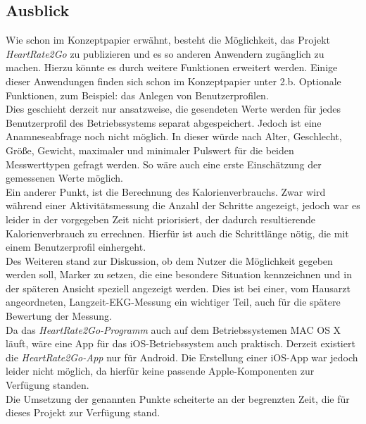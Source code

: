 \subsection{Ausblick} \label{sec:Ausblick}
Wie schon im Konzeptpapier erwähnt, besteht die Möglichkeit, das Projekt \textit{HeartRate2Go} zu publizieren und es so anderen Anwendern zugänglich zu machen. Hierzu könnte es durch weitere Funktionen erweitert werden. Einige dieser Anwendungen finden sich schon im Konzeptpapier unter 2.b. Optionale Funktionen, zum Beispiel: das Anlegen von Benutzerprofilen. \\ Dies geschieht derzeit nur ansatzweise, die gesendeten Werte werden für jedes Benutzerprofil des Betriebssystems separat abgespeichert. Jedoch ist eine Anamneseabfrage noch nicht möglich. In dieser würde nach Alter, Geschlecht, Größe, Gewicht, maximaler und minimaler Pulswert für die beiden Messwerttypen gefragt werden. So wäre auch eine erste Einschätzung der gemessenen Werte möglich.
\\ [0.5]
Ein anderer Punkt, ist die Berechnung des Kalorienverbrauchs. Zwar wird während einer Aktivitätsmessung die Anzahl der Schritte angezeigt, jedoch war es leider in der vorgegeben Zeit nicht priorisiert, der dadurch resultierende Kalorienverbrauch zu errechnen. Hierfür ist auch die Schrittlänge nötig, die mit einem Benutzerprofil einhergeht. \\[0.5]
Des Weiteren stand zur Diskussion, ob dem Nutzer die Möglichkeit gegeben werden soll, Marker zu setzen, die eine besondere Situation kennzeichnen und in der späteren Ansicht speziell angezeigt werden. Dies ist bei einer, vom Hausarzt angeordneten, Langzeit-EKG-Messung ein wichtiger Teil, auch für die spätere Bewertung der Messung. \\[0.5]
Da das \textit{HeartRate2Go-Programm} auch auf dem Betriebssystemen MAC OS X läuft, wäre eine App für das iOS-Betriebssystem auch praktisch. Derzeit existiert die \textit{HeartRate2Go-App} nur für Android. Die Erstellung einer iOS-App war jedoch leider nicht möglich, da hierfür keine passende Apple-Komponenten zur Verfügung standen.\\[0.5]
Die Umsetzung der genannten Punkte scheiterte an der begrenzten Zeit, die für dieses Projekt zur Verfügung stand. \\[0.5]
